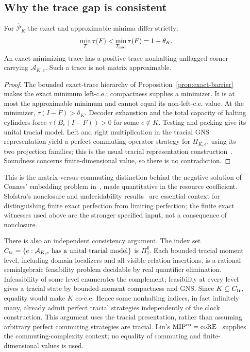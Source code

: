 \subsection{Why the trace gap is consistent}
\begin{proposition}\label{prop:gate-gap}
For $\widehat{\mathcal P}_K$ the exact and approximable minima differ strictly:
\[
 \min_{\mathcal T}\tau(F)<\min_{\mathcal T_{\rm mat}}\tau(F)=1-\theta_K.
\]
An exact minimizing trace has a positive-trace nonhalting unflagged corner carrying $\mathcal A_{K,e}$. Such a trace is not matrix approximable.
\end{proposition}
\begin{proof}
The bounded exact-trace hierarchy of Proposition~\ref{prop:exact-barrier} makes the exact minimum left-c.e.; compactness supplies a minimizer. It is at most the approximable minimum and cannot equal its non-left-c.e. value. At the minimizer, $\tau(I-F)>\theta_K$. Decoder exhaustion and the total capacity of halting cylinders force $\tau(B_e(I-F))>0$ for some $e\notin K$. Testing and packing give its unital tracial model. Left and right multiplication in the tracial GNS representation yield a perfect commuting-operator strategy for $H_{K,e}$, using its two projection families; this is the usual tracial representation construction~\cite{PSSSTW16,KPS18}. Soundness concerns finite-dimensional value, so there is no contradiction.
\end{proof}

This is the matrix-versus-commuting distinction behind the negative solution of Connes' embedding problem in~\cite{JNVWY}, made quantitative in the resource coefficient. Slofstra's nonclosure and undecidability results~\cite{Slo19} are essential context for distinguishing finite exact perfection from limiting perfection; the finite exact witnesses used above are the stronger specified input, not a consequence of nonclosure.

There is also an independent consistency argument. The index set $C_{\rm tr}=\{e:\mathcal A_{K,e}\text{ has a unital tracial model}\}$ is $\Pi^0_1$. Each bounded tracial moment level, including domain localizers and all visible relation insertions, is a rational semialgebraic feasibility problem decidable by real quantifier elimination. Infeasibility of some level enumerates the complement; feasibility at every level gives a tracial state by bounded-moment compactness and GNS. Since $K\subseteq C_{\rm tr}$, equality would make $K$ co-c.e. Hence some nonhalting indices, in fact infinitely many, already admit perfect tracial strategies independently of the clock construction. This argument uses the tracial presentation, rather than assuming arbitrary perfect commuting strategies are tracial. Lin's $\mathrm{MIP}^{\rm co}=\mathrm{coRE}$~\cite{Lin25} supplies the commuting-complexity context; no equality of commuting and finite-dimensional values is used.

